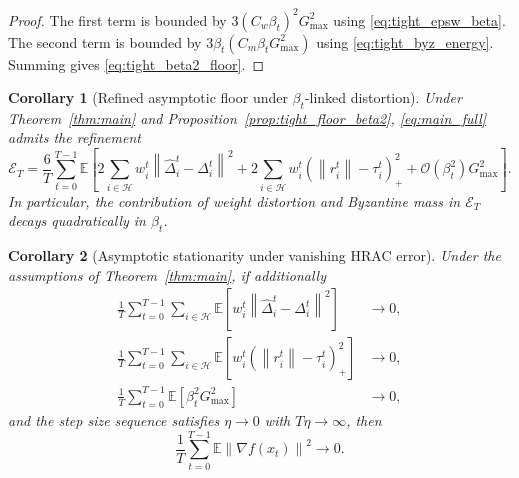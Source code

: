 \documentclass[11pt,a4paper]{article}
\newtheorem{corollary}{Corollary}
\theoremstyle{remark}
\newcommand{\E}{\mathbb{E}}
\newcommand{\HH}{\mathcal{H}}
\newcommand{\norm}[1]{\left\lVert #1 \right\rVert}
\begin{document}
\begin{proof}
The first term is bounded by
\(
3(C_w\beta_t)^2 G_{\max}^2
\)
using \eqref{eq:tight_epsw_beta}.
The second term is bounded by
\(
3\beta_t(C_m\beta_t G_{\max}^2)
\)
using \eqref{eq:tight_byz_energy}. Summing gives
\eqref{eq:tight_beta2_floor}.
\end{proof}

\begin{corollary}[Refined asymptotic floor under \(\beta_t\)-linked distortion]
\label{cor:refined_beta2_floor}
Under Theorem~\ref{thm:main} and Proposition~\ref{prop:tight_floor_beta2},
\eqref{eq:main_full} admits the refinement
\[
    \mathcal{E}_T
    =
    \frac{6}{T}\sum_{t=0}^{T-1}\E\!\left[
        2\sum_{i\in\HH} w_i^t \norm{\hat{\Delta}_i^t-\Delta_i^t}^2
        +2\sum_{i\in\HH} w_i^t(\norm{r_i^t}-\tau_i^t)_+^2
        +\mathcal{O}(\beta_t^2)G_{\max}^2
    \right].
\]
In particular, the contribution of weight distortion and Byzantine mass in
\(\mathcal{E}_T\) decays quadratically in \(\beta_t\).
\end{corollary}

\begin{corollary}[Asymptotic stationarity under vanishing HRAC error]
\label{cor:vanishing}
Under the assumptions of Theorem~\ref{thm:main}, if additionally
\begin{align}
    \frac{1}{T}\sum_{t=0}^{T-1}\sum_{i\in\HH}
    \E\!\left[w_i^t \norm{\hat{\Delta}_i^t-\Delta_i^t}^2\right]
    &\to 0,
    \label{eq:v1}\\
    \frac{1}{T}\sum_{t=0}^{T-1}\sum_{i\in\HH}
    \E\!\left[w_i^t(\norm{r_i^t}-\tau_i^t)_+^2\right]
    &\to 0,
    \label{eq:v2}\\
    \frac{1}{T}\sum_{t=0}^{T-1}
    \E\!\left[\beta_t^2 G_{\max}^2\right]
    &\to 0,
    \label{eq:v3}
\end{align}
and the step size sequence satisfies \(\eta \to 0\) with \(T\eta \to \infty\),
then
\begin{equation}
    \frac{1}{T}\sum_{t=0}^{T-1}\E\norm{\nabla f(x_t)}^2 \to 0.
    \label{eq:stationarity}
\end{equation}
\end{corollary}
\end{document}
